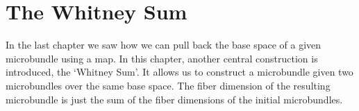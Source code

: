 \chapter{The Whitney Sum}\label{chapter::whitney}
\begin{myparagraph}
    In the last chapter we saw how we can pull back the base space of a given microbundle using a map.
    In this chapter, another central construction is introduced, the `Whitney Sum'.
    It allows us to construct a microbundle given two microbundles over the same base space.
    The fiber dimension of the resulting microbundle is just the sum of the fiber dimensions of the initial microbundles.
\end{myparagraph}


